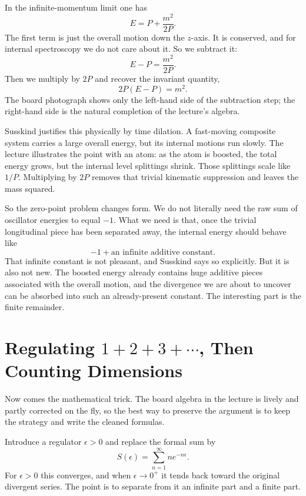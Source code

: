 In the infinite-momentum limit one has
\begin{equation}
E=P+\frac{m^{2}}{2P}.
\end{equation}
The first term is just the overall motion down the \(z\)-axis. It is conserved, and for internal spectroscopy we do not care about it. So we subtract it:
\begin{equation}
E-P=\frac{m^{2}}{2P}.
\end{equation}
Then we multiply by \(2P\) and recover the invariant quantity,
\begin{equation}
2P(E-P)=m^{2}.
\end{equation}
The board photograph shows only the left-hand side of the subtraction step; the right-hand side is the natural completion of the lecture's algebra.

Susskind justifies this physically by time dilation. A fast-moving composite system carries a large overall energy, but its internal motions run slowly. The lecture illustrates the point with an atom: as the atom is boosted, the total energy grows, but the internal level splittings shrink. Those splittings scale like \(1/P\). Multiplying by \(2P\) removes that trivial kinematic suppression and leaves the mass squared.

So the zero-point problem changes form. We do not literally need the raw sum of oscillator energies to equal \(-1\). What we need is that, once the trivial longitudinal piece has been separated away, the internal energy should behave like
\begin{equation}
-1+\text{an infinite additive constant}.
\end{equation}
That infinite constant is not pleasant, and Susskind says so explicitly. But it is also not new. The boosted energy already contains huge additive pieces associated with the overall motion, and the divergence we are about to uncover can be absorbed into such an already-present constant. The interesting part is the finite remainder.

\section{Regulating \(1+2+3+\cdots\), Then Counting Dimensions}

Now comes the mathematical trick. The board algebra in the lecture is lively and partly corrected on the fly, so the best way to preserve the argument is to keep the strategy and write the cleaned formulas.

Introduce a regulator \(\epsilon>0\) and replace the formal sum by
\begin{equation}
S(\epsilon)=\sum_{n=1}^{\infty} n e^{-n\epsilon}.
\end{equation}
For \(\epsilon>0\) this converges, and when \(\epsilon\to 0^{+}\) it tends back toward the original divergent series. The point is to separate from it an infinite part and a finite part.

